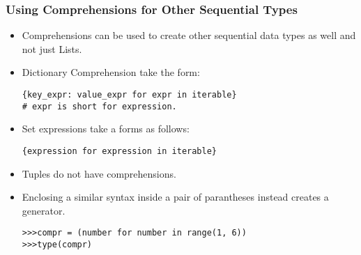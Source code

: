 \documentclass{beamer}
\begin{document}
\begin{frame}[fragile]
\frametitle{Using Comprehensions for Other Sequential Types}
\begin{itemize}
\item Comprehensions can be used to create other sequential data types as well and not just Lists.
\item Dictionary Comprehension take the form:
\begin{lstlisting}
{key_expr: value_expr for expr in iterable}
# expr is short for expression.
\end{lstlisting}
\item Set expressions take a forms as follows:
\begin{lstlisting}
{expression for expression in iterable}
\end{lstlisting}
\item Tuples do not have comprehensions. 
\item Enclosing a similar syntax inside a pair of parantheses instead creates a generator.
\begin{lstlisting}
>>>compr = (number for number in range(1, 6))
>>>type(compr)
\end{lstlisting}
\end{itemize}
\end{frame}
\end{document}
